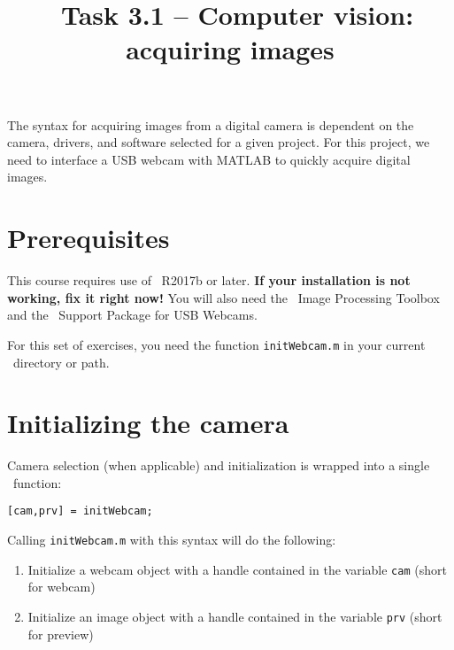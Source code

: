 \documentclass{tufte-handout}
\title{\usnaCourseNumber\ Task 3.1 -- Computer vision: acquiring images}
\author{\usnaInstructorShort}
\date{\printdate{\courseWeekTwo}}
\begin{document}
\maketitle

The syntax for acquiring images from a digital camera is dependent on the camera, drivers, and software selected for a given project. For this project, we need to interface a USB webcam with MATLAB to quickly acquire digital images.

\section{Prerequisites} 
This course requires use of \Matlab\ R2017b or later. \textbf{If your installation is not working, fix it right now!} You will also need the \Matlab\ Image Processing Toolbox and the \Matlab\ Support Package for USB Webcams. 
 
For this set of exercises, you need the function \lstinline{initWebcam.m} in your current \Matlab\ directory or path.
        
        
\section{Initializing the camera}
Camera selection (when applicable) and initialization is wrapped into a single \Matlab\ function:
\begin{lstlisting}[style=usnaMatlab]
[cam,prv] = initWebcam; 
\end{lstlisting}
Calling \lstinline{initWebcam.m} with this syntax will do the following:
\begin{enumerate}
\item Initialize a webcam object with a handle contained in the variable \lstinline{cam} (short for webcam)
\item Initialize an image object with a handle contained in the variable \lstinline{prv} (short for preview)
\end{enumerate}
\end{document}
